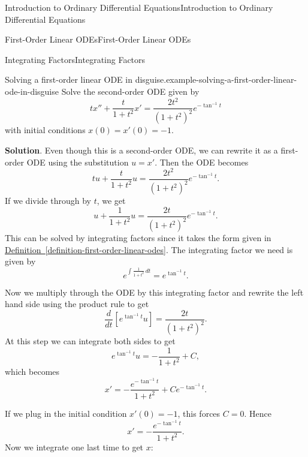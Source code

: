 \documentclass[10pt,]{book}
\numberwithin{equation}{section}
\newcommand{\dv}[3][]{\dfrac{d^{#1} #2}{d #3^{#1}}}
\begin{document}
\begin{chapterptx}{Introduction to Ordinary Differential Equations}{}{Introduction to Ordinary Differential Equations}{}{}
\begin{sectionptx}{First-Order Linear ODEs}{}{First-Order Linear ODEs}{}{}
\begin{subsectionptx}{Integrating Factors}{}{Integrating Factors}{}{}
\begin{example}{Solving a first-order linear ODE in disguise.}{example-solving-a-first-order-linear-ode-in-disguise}%
\hypertarget{p-81}{}%
Solve the second-order ODE given by%
\begin{equation*}
tx''+\frac{t}{1+t^{2}}x' = \frac{2t^{2}}{(1+t^{2})^{2}}e^{-\tan^{-1}t}
\end{equation*}
with initial conditions \(x(0) = x'(0) = -1.\)%
\par\smallskip%
\noindent\textbf{Solution}.\hypertarget{solution-14}{}\quad%
\hypertarget{p-82}{}%
Even though this is a second-order ODE, we can rewrite it as a first-order ODE using the substitution \(u = x'\). Then the ODE becomes%
\begin{equation*}
tu+\frac{t}{1+t^{2}}u = \frac{2t^{2}}{(1+t^{2})^{2}}e^{-\tan^{-1}t}.
\end{equation*}
If we divide through by \(t\), we get%
\begin{equation*}
u+\frac{1}{1+t^{2}}u = \frac{2t}{(1+t^{2})^{2}}e^{-\tan^{-1}t}.
\end{equation*}
This can be solved by integrating factors since it takes the form given in \hyperref[definition-first-order-linear-odes]{Definition~\ref{definition-first-order-linear-odes}}. The integrating factor we need is given by%
\begin{equation*}
e^{\int \frac{1}{1+t^{2}}\,dt} = e^{\tan^{-1}t}.
\end{equation*}
%
\par
\hypertarget{p-83}{}%
Now we multiply through the ODE by this integrating factor and rewrite the left hand side using the product rule to get%
\begin{equation*}
\dv{}{t}[e^{\tan^{-1}t}u] = \frac{2t}{(1+t^{2})^{2}}.
\end{equation*}
At this step we can integrate both sides to get%
\begin{equation*}
e^{\tan^{-1}t}u = -\frac{1}{1+t^{2}}+C,
\end{equation*}
which becomes%
\begin{equation*}
x' = -\frac{e^{-\tan^{-1}t}}{1+t^{2}}+Ce^{-\tan^{-1}t}.
\end{equation*}
%
\par
\hypertarget{p-84}{}%
If we plug in the initial condition \(x'(0) = -1\), this forces \(C=0\). Hence%
\begin{equation*}
x' = -\frac{e^{-\tan^{-1}t}}{1+t^{2}}.
\end{equation*}
Now we integrate one last time to get \(x\):%

\end{example}
\end{subsectionptx}
\end{sectionptx}
\end{chapterptx}
\end{document}
